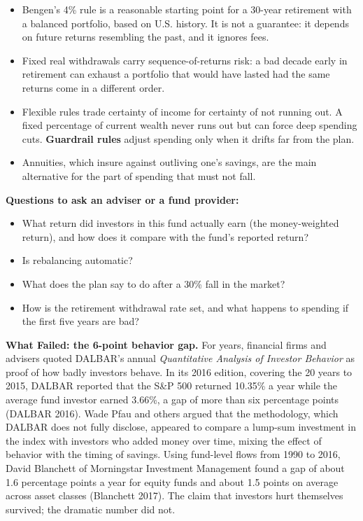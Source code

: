 \begin{itemize}
  \item Bengen's 4\% rule is a reasonable starting point for a 30-year retirement with a balanced portfolio, based on U.S. history. It is not a guarantee: it depends on future returns resembling the past, and it ignores fees.
  \item Fixed real withdrawals carry sequence-of-returns risk: a bad decade early in retirement can exhaust a portfolio that would have lasted had the same returns come in a different order.
  \item Flexible rules trade certainty of income for certainty of not running out. A fixed percentage of current wealth never runs out but can force deep spending cuts. \textbf{Guardrail rules} adjust spending only when it drifts far from the plan.
  \item Annuities, which insure against outliving one's savings, are the main alternative for the part of spending that must not fall.
\end{itemize}

\textbf{Questions to ask an adviser or a fund provider:}

\begin{itemize}
  \item What return did investors in this fund actually earn (the money-weighted return), and how does it compare with the fund's reported return?
  \item Is rebalancing automatic?
  \item What does the plan say to do after a 30\% fall in the market?
  \item How is the retirement withdrawal rate set, and what happens to spending if the first five years are bad?
\end{itemize}

\begin{callout}
\textbf{What Failed: the 6-point behavior gap.} For years, financial firms and advisers quoted DALBAR's annual \emph{Quantitative Analysis of Investor Behavior} as proof of how badly investors behave. In its 2016 edition, covering the 20 years to 2015, DALBAR reported that the S\&P 500 returned 10.35\% a year while the average fund investor earned 3.66\%, a gap of more than six percentage points (DALBAR 2016). Wade Pfau and others argued that the methodology, which DALBAR does not fully disclose, appeared to compare a lump-sum investment in the index with investors who added money over time, mixing the effect of behavior with the timing of savings. Using fund-level flows from 1990 to 2016, David Blanchett of Morningstar Investment Management found a gap of about 1.6 percentage points a year for equity funds and about 1.5 points on average across asset classes (Blanchett 2017). The claim that investors hurt themselves survived; the dramatic number did not.
\end{callout}

